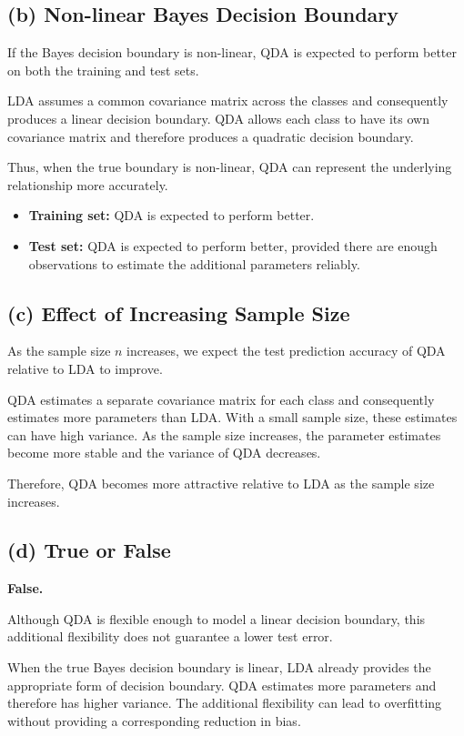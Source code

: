 \documentclass[12pt,a4paper]{article}
\begin{document}
\subsection{(b) Non-linear Bayes Decision Boundary}

If the Bayes decision boundary is non-linear, QDA is expected to perform
better on both the training and test sets.

LDA assumes a common covariance matrix across the classes and consequently
produces a linear decision boundary. QDA allows each class to have its own
covariance matrix and therefore produces a quadratic decision boundary.

Thus, when the true boundary is non-linear, QDA can represent the underlying
relationship more accurately.

\begin{itemize}
    \item \textbf{Training set:} QDA is expected to perform better.
    \item \textbf{Test set:} QDA is expected to perform better, provided
    there are enough observations to estimate the additional parameters
    reliably.
\end{itemize}

\subsection{(c) Effect of Increasing Sample Size}

As the sample size $n$ increases, we expect the test prediction accuracy of
QDA relative to LDA to improve.

QDA estimates a separate covariance matrix for each class and consequently
estimates more parameters than LDA. With a small sample size, these estimates
can have high variance. As the sample size increases, the parameter
estimates become more stable and the variance of QDA decreases.

Therefore, QDA becomes more attractive relative to LDA as the sample size
increases.

\subsection{(d) True or False}

\textbf{False.}

Although QDA is flexible enough to model a linear decision boundary, this
additional flexibility does not guarantee a lower test error.

When the true Bayes decision boundary is linear, LDA already provides the
appropriate form of decision boundary. QDA estimates more parameters and
therefore has higher variance. The additional flexibility can lead to
overfitting without providing a corresponding reduction in bias.
\end{document}
